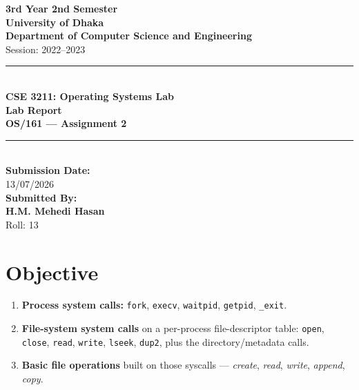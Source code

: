 \documentclass[11pt,a4paper]{article}
\date{}
\newcommand{\coursecode}{CSE 3211}
\newcommand{\coursename}{Operating Systems Lab}
\newcommand{\reporttitle}{OS/161 --- Assignment 2}
\newcommand{\studentname}{H.M. Mehedi Hasan}
\newcommand{\studentroll}{13}
\newcommand{\session}{2022--2023}
\newcommand{\submissiondate}{13/07/2026}
\begin{document}
\begin{titlepage}
\thispagestyle{empty}
\begin{center}
\vspace*{1.1cm}

{\Large\bfseries 3rd Year 2nd Semester}\\[0.55cm]
{\Large\bfseries University of Dhaka}\\[0.35cm]
{\large\bfseries Department of Computer Science and Engineering}\\[0.35cm]
{\large Session: \session}\\[1.4cm]

\rule{0.78\textwidth}{0.8pt}\\[0.65cm]
{\Large\bfseries \coursecode: \coursename}\\[1.0cm]

{\Huge\bfseries Lab Report}\\[0.45cm]
{\Large\bfseries \reporttitle}\\[0.65cm]
\rule{0.78\textwidth}{0.8pt}\\[1.4cm]
  

{\large\bfseries Submission Date:}\\[0.2cm]
{\large \submissiondate}\\[1.2cm]

{\large\bfseries Submitted By:}\\[0.25cm]
{\large\bfseries \studentname}\\[0.2cm]
{\large Roll: \studentroll}

\vfill
\end{center}
\end{titlepage}

\tableofcontents
\newpage
{}

 

\section{Objective}

\begin{enumerate}[leftmargin=1.4em]
  \item \textbf{Process system calls:} \texttt{fork}, \texttt{execv},
        \texttt{waitpid}, \texttt{getpid}, \texttt{\_exit}.
  \item \textbf{File-system system calls} on a per-process file-descriptor
        table: \texttt{open}, \texttt{close}, \texttt{read}, \texttt{write},
        \texttt{lseek}, \texttt{dup2}, plus the directory/metadata calls.
  \item \textbf{Basic file operations} built on those syscalls ---
        \emph{create}, \emph{read}, \emph{write}, \emph{append}, \emph{copy}.
\end{enumerate}
\end{document}
